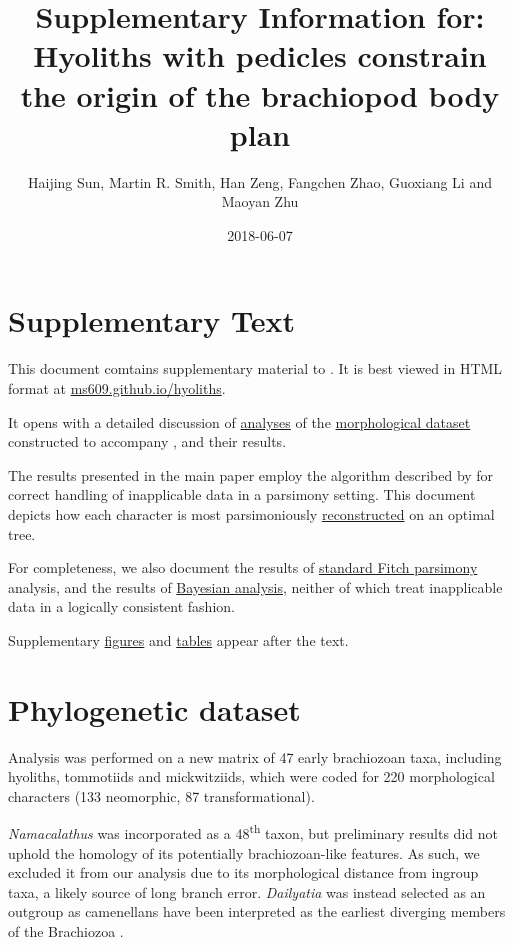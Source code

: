 \documentclass[openany]{book}
\title{Supplementary Information for: \newline\newline Hyoliths with pedicles
constrain the origin of the brachiopod body plan}
\author{Haijing Sun, Martin R. Smith, Han Zeng, Fangchen Zhao, Guoxiang Li and
Maoyan Zhu}
\date{2018-06-07}
\theoremstyle{definition}
\theoremstyle{definition}
\theoremstyle{definition}
\theoremstyle{remark}
\begin{document}
\maketitle

{
\setcounter{tocdepth}{1}
\tableofcontents
}
\chapter*{Supplementary Text}\label{supplementary-text}

This document comtains supplementary material to
\citet{Sun2018Hyolithswith}. It is best viewed in HTML format at
\href{https://ms609.github.io/hyoliths/}{ms609.github.io/hyoliths}.

It opens with a detailed discussion of
\protect\hyperlink{treesearch}{analyses} of the
\protect\hyperlink{dataset}{morphological dataset} constructed to
accompany \citet{Sun2018Hyolithswith}, and their results.

The results presented in the main paper employ the algorithm described
by \citet{Brazeau2018} for correct handling of inapplicable data in a
parsimony setting. This document depicts how each character is most
parsimoniously \protect\hyperlink{reconstructions}{reconstructed} on an
optimal tree.

For completeness, we also document the results of
\protect\hyperlink{fitch}{standard Fitch parsimony} analysis, and the
results of \protect\hyperlink{bayesian}{Bayesian analysis}, neither of
which treat inapplicable data in a logically consistent fashion.

Supplementary \protect\hyperlink{figures}{figures} and
\protect\hyperlink{table}{tables} appear after the text.

\hypertarget{dataset}{\chapter{Phylogenetic dataset}\label{dataset}}

Analysis was performed on a new matrix of 47 early brachiozoan taxa,
including hyoliths, tommotiids and mickwitziids, which were coded for
220 morphological characters (133 neomorphic, 87 transformational).

\emph{Namacalathus} was incorporated as a 48\textsuperscript{th} taxon,
but preliminary results did not uphold the homology of its potentially
brachiozoan-like features. As such, we excluded it from our analysis due
to its morphological distance from ingroup taxa, a likely source of long
branch error. \emph{Dailyatia} was instead selected as an outgroup as
camenellans have been interpreted as the earliest diverging members of
the Brachiozoa \citep{Skovsted2015Theearly, Zhao2017}.
\end{document}
